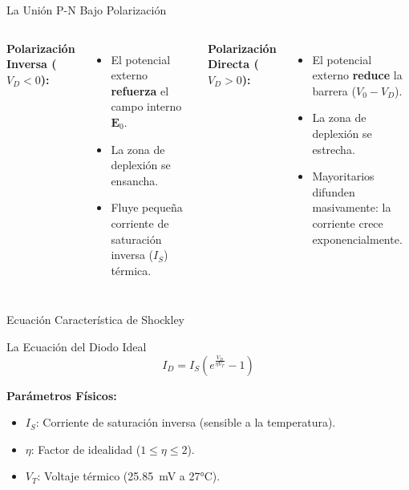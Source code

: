 \documentclass[10pt, aspectratio=169]{beamer}
\begin{document}
\begin{frame}{La Unión P-N Bajo Polarización}
  \begin{columns}
      \textbf{Polarización Inversa ($V_D < 0$):}
      \begin{itemize}
          \item El potencial externo \textbf{refuerza} el campo interno $\mathbf{E}_0$.
          \item La zona de deplexión se ensancha.
          \item Fluye pequeña corriente de saturación inversa ($I_S$) térmica.
      \end{itemize}
      
      \textbf{Polarización Directa ($V_D > 0$):}
      \begin{itemize}
          \item El potencial externo \textbf{reduce} la barrera ($V_0 - V_D$).
          \item La zona de deplexión se estrecha.
          \item Mayoritarios difunden masivamente: la corriente crece exponencialmente.
      \end{itemize}
  \end{columns}
\end{frame}

\begin{frame}{Ecuación Característica de Shockley}
  \begin{block}{La Ecuación del Diodo Ideal}
  \begin{equation*}
  I_D = I_S \left( e^{\frac{V_D}{\eta V_T}} - 1 \right)
  \end{equation*}
  \end{block}
  
  \textbf{Parámetros Físicos:}
  \begin{itemize}
      \item $I_S$: Corriente de saturación inversa (sensible a la temperatura).
      \item $\eta$: Factor de idealidad ($1 \le \eta \le 2$).
      \item $V_T$: Voltaje térmico (\SI{25.85}{\milli\volt} a 27°C).
  \end{itemize}
\end{frame}
\end{document}
